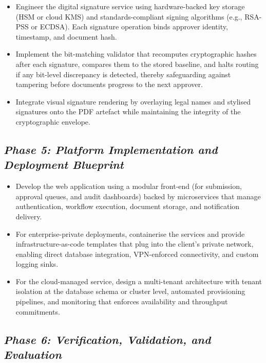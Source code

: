 \documentclass[12pt,oneside,openright,a4paper]{cpe-english-project}
\begin{document}
\begin{itemize}
\item Engineer the digital signature service using hardware-backed key
storage (HSM or cloud KMS) and standards-compliant signing algorithms
(e.g., RSA-PSS or ECDSA). Each signature operation binds approver
identity, timestamp, and document hash.
\item Implement the bit-matching validator that recomputes cryptographic
hashes after each signature, compares them to the stored baseline, and
halts routing if any bit-level discrepancy is detected, thereby
safeguarding against tampering before documents progress to the next
approver.
\item Integrate visual signature rendering by overlaying legal names
and stylised signatures onto the PDF artefact while maintaining the
integrity of the cryptographic envelope.
\end{itemize}

\subsection{\texorpdfstring{\emph{Phase 5: Platform Implementation and Deployment Blueprint}}{Phase 5: Platform Implementation and Deployment Blueprint}}

\begin{itemize}
\item Develop the web application using a modular front-end (for
submission, approval queues, and audit dashboards) backed by
microservices that manage authentication, workflow execution, document
storage, and notification delivery.
\item For enterprise-private deployments, containerise the services and
provide infrastructure-as-code templates that plug into the client's
private network, enabling direct database integration, VPN-enforced
connectivity, and custom logging sinks.
\item For the cloud-managed service, design a multi-tenant architecture
with tenant isolation at the database schema or cluster level, automated
provisioning pipelines, and monitoring that enforces availability and
throughput commitments.
\end{itemize}

\subsection{\texorpdfstring{\emph{Phase 6: Verification, Validation, and Evaluation}}{Phase 6: Verification, Validation, and Evaluation}}
\end{document}
